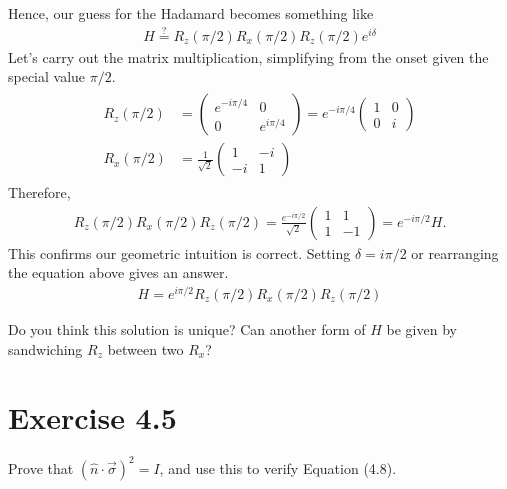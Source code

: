 \documentclass{book}
\begin{document}
    Hence, our guess for the Hadamard becomes something like
    \begin{align}
        H \stackrel{?}{=} R_z(\pi/2) R_x(\pi/2) R_z(\pi/2) e^{i\delta}
    \end{align}
    Let's carry out the matrix multiplication, simplifying from the onset given the special value $\pi/2$. 
    \begin{align}
    \begin{aligned}
        R_z(\pi/2) &= \begin{pmatrix}
            e^{-i\pi/4} & 0 \\
            0 & e^{i\pi/4}
        \end{pmatrix} = e^{-i\pi/4}\begin{pmatrix}
                1 & 0 \\
                0 & i
        \end{pmatrix} \\
        R_x(\pi/2) &= \frac{1}{\sqrt{2}} \begin{pmatrix}
            1 & -i \\
            -i & 1
        \end{pmatrix}
    \end{aligned}
    \end{align}
    Therefore,
    \begin{align}
        R_z(\pi/2) R_x(\pi/2) R_z(\pi/2) = \frac{e^{-i\pi/2}}{\sqrt{2}} \begin{pmatrix}
            1 & 1 \\
            1 & -1
        \end{pmatrix} = e^{-i\pi/2} H. 
    \end{align}
    This confirms our geometric intuition is correct. Setting $\delta = i\pi/2$ or rearranging the equation above gives an answer. 
    \begin{align}
        H = e^{i\pi/2} R_z(\pi/2) R_x(\pi/2) R_z(\pi/2)
    \end{align}
     
     Do you think this solution is unique? Can another form of $H$ be given by sandwiching $R_z$ between two $R_x$?
    
\section*{Exercise 4.5}
    Prove that $(\hat{n} \cdot \vec{\sigma})^2 = I$, and use this to verify Equation (4.8).
    
\end{document}
